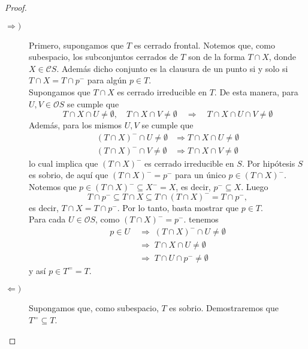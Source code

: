 \begin{proof}
\begin{description}
    \item[$\Rightarrow )$] Primero, supongamos que $T$ es cerrado frontal. Notemos que, como subespacio, los subconjuntos cerrados de $T$ son de la forma $T\cap X$, donde $X\in \mathcal{C}S$. Además dicho conjunto es la clausura de un punto si y solo si $T\cap X=T\cap p^-$ para algún $p\in T$.\\

    Supongamos que $T\cap X$ es cerrado irreducible en $T$. De esta manera, para $U, V\in \mathcal{O}S$ se cumple que 
    \[
    T\cap X\cap U\neq \emptyset,\quad T\cap X\cap V\neq \emptyset \quad \Rightarrow \quad T\cap X\cap U\cap V\neq \emptyset
    \]
    Además, para los mismos $U, V$ se cumple que 
    \[
    \begin{split}
    (T\cap X)^-\cap U\neq \emptyset & \Rightarrow T\cap X\cap U\neq \emptyset\\
    (T\cap X)^-\cap V\neq \emptyset & \Rightarrow T\cap X\cap V\neq \emptyset
        \end{split}
    \]
    lo cual implica que $(T\cap X)^-$ es cerrado irreducible en $S$. Por hipótesis $S$ es sobrio, de aquí que $(T\cap X)^-=p^-$ para un único $p\in (T\cap X)^-$. Notemos que $p\in (T\cap X)^-\subseteq X^-=X$, es decir, $p^-\subseteq X$. Luego 
    \[
    T\cap p^-\subseteq T\cap X\subseteq T\cap (T\cap X)^-= T\cap p^-,
    \]
    es decir, $T\cap X=T\cap p^-$. Por lo tanto, basta mostrar que $p\in T$.\\

    Para cada $U\in \mathcal{O}S$, como $(T\cap X)^-=p^-$. tenemos 
    \[
    \begin{split}
        p\in U\; &\Rightarrow \; (T\cap X)^-\cap U\neq \emptyset\\
        & \Rightarrow \; T\cap X\cap U\neq \emptyset\\
        &\Rightarrow \; T\cap U\cap p^-\neq \emptyset
    \end{split}
    \]
    y así $p\in T^==T$.
    \item[$\Leftarrow )$] Supongamos que, como subespacio, $T$ es sobrio. Demostraremos que $T^=\subseteq T$.\\


\end{description}
\end{proof}

